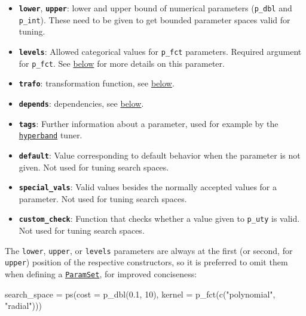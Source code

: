 \documentclass[
]{scrbook}
\newenvironment{Shaded}{\begin{snugshade}}{\end{snugshade}}
\newcommand{\AttributeTok}[1]{\textcolor[rgb]{0.77,0.63,0.00}{#1}}
\newcommand{\DecValTok}[1]{\textcolor[rgb]{0.00,0.00,0.81}{#1}}
\newcommand{\FloatTok}[1]{\textcolor[rgb]{0.00,0.00,0.81}{#1}}
\newcommand{\FunctionTok}[1]{\textcolor[rgb]{0.00,0.00,0.00}{#1}}
\newcommand{\NormalTok}[1]{#1}
\newcommand{\OtherTok}[1]{\textcolor[rgb]{0.56,0.35,0.01}{#1}}
\newcommand{\StringTok}[1]{\textcolor[rgb]{0.31,0.60,0.02}{#1}}
\providecommand{\tightlist}{%
  \setlength{\itemsep}{0pt}\setlength{\parskip}{0pt}}
\renewenvironment{Shaded} {\begin{snugshade}\small} {\end{snugshade}}
\begin{document}
\begin{itemize}
\tightlist
\item
  \textbf{\texttt{lower}}, \textbf{\texttt{upper}}: lower and upper bound of numerical parameters (\texttt{p\_dbl} and \texttt{p\_int}). These need to be given to get bounded parameter spaces valid for tuning.
\item
  \textbf{\texttt{levels}}: Allowed categorical values for \texttt{p\_fct} parameters. Required argument for \texttt{p\_fct}. See \protect\hyperlink{autolevel}{below} for more details on this parameter.
\item
  \textbf{\texttt{trafo}}: transformation function, see \protect\hyperlink{searchspace-trafo}{below}.
\item
  \textbf{\texttt{depends}}: dependencies, see \protect\hyperlink{searchspace-depends}{below}.
\item
  \textbf{\texttt{tags}}: Further information about a parameter, used for example by the \protect\hyperlink{hyperband}{\texttt{hyperband}} tuner.
\item
  \textbf{\texttt{default}}: Value corresponding to default behavior when the parameter is not given. Not used for tuning search spaces.
\item
  \textbf{\texttt{special\_vals}}: Valid values besides the normally accepted values for a parameter. Not used for tuning search spaces.
\item
  \textbf{\texttt{custom\_check}}: Function that checks whether a value given to \texttt{p\_uty} is valid. Not used for tuning search spaces.
\end{itemize}

The \texttt{lower}, \texttt{upper}, or \texttt{levels} parameters are always at the first (or second, for \texttt{upper}) position of the respective constructors, so it is preferred to omit them when defining a \href{https://paradox.mlr-org.com/reference/ParamSet.html}{\texttt{ParamSet}}, for improved conciseness:

\begin{Shaded}
\begin{Highlighting}[]
\NormalTok{search\_space }\OtherTok{=} \FunctionTok{ps}\NormalTok{(}\AttributeTok{cost =} \FunctionTok{p\_dbl}\NormalTok{(}\FloatTok{0.1}\NormalTok{, }\DecValTok{10}\NormalTok{), }\AttributeTok{kernel =} \FunctionTok{p\_fct}\NormalTok{(}\FunctionTok{c}\NormalTok{(}\StringTok{"polynomial"}\NormalTok{, }\StringTok{"radial"}\NormalTok{)))}
\end{Highlighting}
\end{Shaded}
\end{document}
